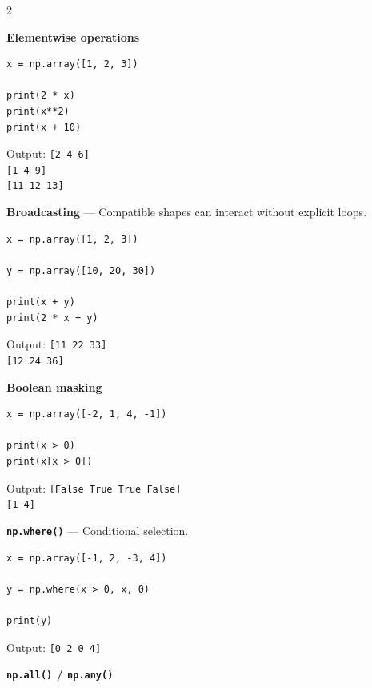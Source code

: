 \documentclass[10pt,a4paper]{article}
\begin{document}
\begin{multicols}{2}
\begin{card}
\textbf{Elementwise operations}

\begin{lstlisting}[style=pythonstyle]
x = np.array([1, 2, 3])

print(2 * x)
print(x**2)
print(x + 10)
\end{lstlisting}

Output:
\texttt{[2 4 6]}\\
\texttt{[1 4 9]}\\
\texttt{[11 12 13]}
\end{card}

\begin{card}
\textbf{Broadcasting} --- Compatible shapes can interact without explicit loops.

\begin{lstlisting}[style=pythonstyle]
x = np.array([1, 2, 3])

y = np.array([10, 20, 30])

print(x + y)
print(2 * x + y)
\end{lstlisting}

Output:
\texttt{[11 22 33]}\\
\texttt{[12 24 36]}
\end{card}

\begin{card}
\textbf{Boolean masking}

\begin{lstlisting}[style=pythonstyle]
x = np.array([-2, 1, 4, -1])

print(x > 0)
print(x[x > 0])
\end{lstlisting}

Output:
\texttt{[False True True False]}\\
\texttt{[1 4]}
\end{card}

\begin{card}
\textbf{\texttt{np.where()}} --- Conditional selection.

\begin{lstlisting}[style=pythonstyle]
x = np.array([-1, 2, -3, 4])

y = np.where(x > 0, x, 0)

print(y)
\end{lstlisting}

Output:
\texttt{[0 2 0 4]}
\end{card}

\begin{card}
\textbf{\texttt{np.all()} / \texttt{np.any()}}


\end{card}
\end{multicols}
\end{document}
